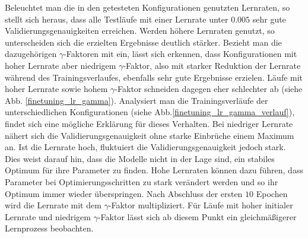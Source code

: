 Beleuchtet man die in den getesteten Konfigurationen genutzten Lernraten, so stellt sich heraus, dass alle Testläufe mit einer Lernrate unter $0.005$ sehr gute Validierungsgenauigkeiten erreichen. Werden höhere Lernraten genutzt, so unterscheiden sich die erzielten Ergebnisse deutlich stärker. Bezieht man die dazugehörigen $\gamma$-Faktoren mit ein, lässt sich erkennen, dass Konfigurationen mit hoher Lernrate aber niedrigem $\gamma$-Faktor, also mit starker Reduktion der Lernrate während des Trainingsverlaufes, ebenfalls sehr gute Ergebnisse erzielen. Läufe mit hoher Lernrate sowie hohem $\gamma$-Faktor schneiden dagegen eher schlechter ab (siehe Abb. \ref{finetuning_lr_gamma}). Analysiert man die Trainingsverläufe der unterschiedlichen Konfigurationen (siehe Abb.\ref{finetuning_lr_gamma_verlauf}), findet sich eine mögliche Erklärung für dieses Verhalten. Bei niedriger Lernrate nähert sich die Validierungsgenauigkeit ohne starke Einbrüche einem Maximum an. Ist die Lernrate hoch, fluktuiert die Validierungsgenauigkeit jedoch stark. Dies weist darauf hin, dass die Modelle nicht in der Lage sind, ein stabiles Optimum für ihre Parameter zu finden. Hohe Lernraten können dazu führen, dass Parameter bei Optimierungsschritten zu stark verändert werden und so ihr Optimum immer wieder überspringen. Nach Abschluss der ersten $10$ Epochen wird die Lernrate mit dem $\gamma$-Faktor multipliziert. Für Läufe mit hoher initialer Lernrate und niedrigem $\gamma$-Faktor lässt sich ab diesem Punkt ein gleichmäßigerer Lernprozess beobachten.

